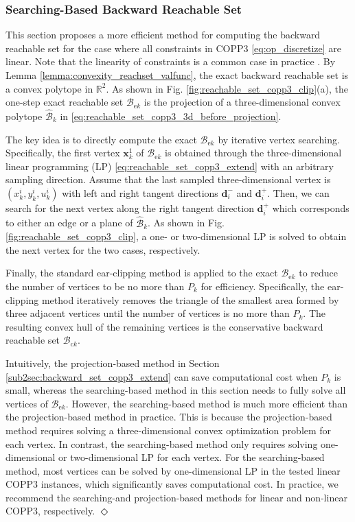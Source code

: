 \documentclass[journal]{IEEEtran}
\theoremstyle{definition}
\theoremstyle{definition}
\newtheorem*{remark}{Remark}
\let\oldremark\remark
\let\endoldremark\endremark
\renewenvironment{remark}
  {\oldremark}
  {\hfill$\Diamond$\endoldremark}
\newcommand\R{{\mathbb{R}}}
\renewcommand\vector[1]{\boldsymbol{#1}}
\newcommand\vd{{\vector{d}}}
\newcommand\vx{{\vector{x}}}
\begin{document}
\subsubsection{Searching-Based Backward Reachable Set}\label{sub2sec:backward_set_copp3_clip}

This section proposes a more efficient method for computing the backward reachable set for the case where all constraints in COPP3 \eqref{eq:op_discretize} are linear. Note that the linearity of constraints is a common case in practice \cite[Appendix A.2]{wang2026online}. By Lemma \ref{lemma:convexity_reachset_valfunc}, the exact backward reachable set is a convex polytope in $\R^2$. As shown in Fig. \ref{fig:reachable_set_copp3_clip}(a), the one-step exact reachable set $\mathcal{B}_{\text{e}k}$ is the projection of a three-dimensional convex polytope $\widehat{\mathcal{B}}_k$ in \eqref{eq:reachable_set_copp3_3d_before_projection}.

The key idea is to directly compute the exact $\mathcal{B}_{\text{e}k}$ by iterative vertex searching. Specifically, the first vertex $\vx_k^1$ of $\mathcal{B}_{\text{e}k}$ is obtained through the three-dimensional linear programming (LP) \eqref{eq:reachable_set_copp3_extend} with an arbitrary sampling direction. Assume that the last sampled three-dimensional vertex is $(x_k^i, y_k^i, u_k^i)$ with left and right tangent directions $\vd_{i}^-$ and $\vd_i^+$. Then, we can search for the next vertex along the right tangent direction $\vd_i^+$ which corresponds to either an edge or a plane of $\widehat{\mathcal{B}}_k$. As shown in Fig. \ref{fig:reachable_set_copp3_clip}, a one- or two-dimensional LP is solved to obtain the next vertex for the two cases, respectively.

Finally, the standard ear-clipping method is applied to the exact $\mathcal{B}_{\text{e}k}$ to reduce the number of vertices to be no more than $P_k$ for efficiency. Specifically, the ear-clipping method iteratively removes the triangle of the smallest area formed by three adjacent vertices until the number of vertices is no more than $P_k$. The resulting convex hull of the remaining vertices is the conservative backward reachable set $\mathcal{B}_{\text{c}k}$.

\begin{remark}
    Intuitively, the projection-based method in Section \ref{sub2sec:backward_set_copp3_extend} can save computational cost when $P_k$ is small, whereas the searching-based method in this section needs to fully solve all vertices of $\mathcal{B}_{\text{e}k}$. However, the searching-based method is much more efficient than the projection-based method in practice. This is because the projection-based method requires solving a three-dimensional convex optimization problem for each vertex. In contrast, the searching-based method only requires solving one-dimensional or two-dimensional LP for each vertex. For the searching-based method, most vertices can be solved by one-dimensional LP in the tested linear COPP3 instances, which significantly saves computational cost. In practice, we recommend the searching-and projection-based methods for linear and non-linear COPP3, respectively.
\end{remark}
\end{document}
